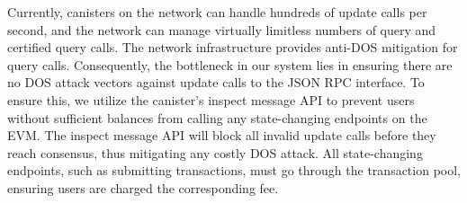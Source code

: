 \documentclass{article}
\begin{document}
Currently, canisters on the network can handle hundreds of update calls per second, and the network can manage virtually limitless numbers of query and certified query calls. The network infrastructure provides anti-DOS mitigation for query calls. Consequently, the bottleneck in our system lies in ensuring there are no DOS attack vectors against update calls to the JSON RPC interface. To ensure this, we utilize the canister’s inspect message API to prevent users without sufficient balances from calling any state-changing endpoints on the EVM. The inspect message API will block all invalid update calls before they reach consensus, thus mitigating any costly DOS attack.  All state-changing endpoints, such as submitting transactions, must go through the transaction pool, ensuring users are charged the corresponding fee.
\end{document}
